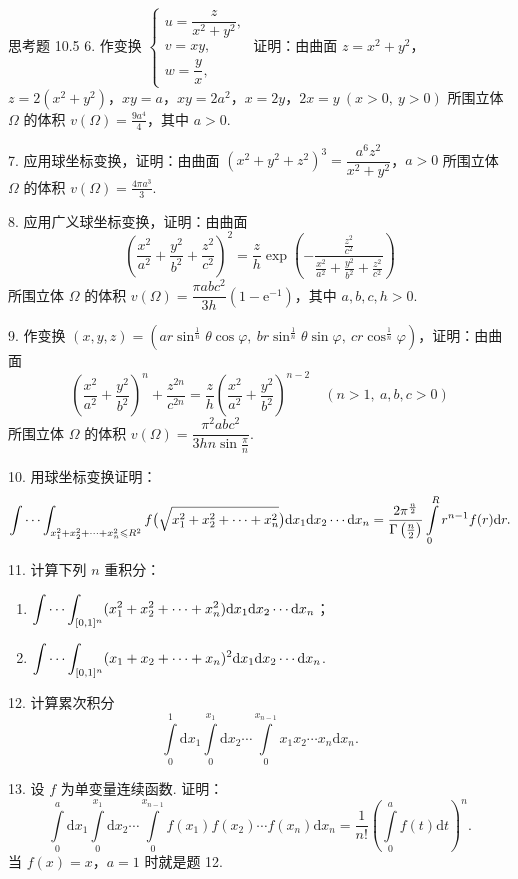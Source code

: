 \begin{exblock}{思考题 10.5}
6. 作变换 $\begin{cases} u = \dfrac{z}{x^2 + y^2},\\ v = xy,\\ w = \dfrac{y}{x}, \end{cases}$
证明：由曲面 $z = x^2 + y^2$，$z = 2(x^2 + y^2)$，$xy = a$，$xy = 2a^2$，$x = 2y$，$2x = y\ (x > 0,\ y > 0)$
所围立体 $\Omega$ 的体积 $v(\Omega) = \frac{9a^4}{4}$，其中 $a > 0$.

7. 应用球坐标变换，证明：由曲面
$(x^2 + y^2 + z^2)^3 = \dfrac{a^6 z^2}{x^2 + y^2}$，$a > 0$ 所围立体 $\Omega$ 的体积
$v(\Omega) = \frac{4\pi a^3}{3}$.

8. 应用广义球坐标变换，证明：由曲面
\[
\left( \frac{x^2}{a^2} + \frac{y^2}{b^2} + \frac{z^2}{c^2} \right)^2
= \frac{z}{h} \exp \left( - \frac{\frac{z^2}{c^2}}{\frac{x^2}{a^2} + \frac{y^2}{b^2} + \frac{z^2}{c^2}} \right)
\]
所围立体 $\Omega$ 的体积
$v(\Omega) = \dfrac{\pi a b c^2}{3h} (1 - \mathrm{e}^{-1})$，其中 $a, b, c, h > 0$.

9. 作变换 $(x, y, z) = (a r \sin^{\frac{1}{n}}\theta \cos\varphi,\ b r \sin^{\frac{1}{n}}\theta \sin\varphi,\
c r \cos^{\frac{1}{n}}\varphi)$，证明：由曲面
\[
\left( \frac{x^2}{a^2} + \frac{y^2}{b^2} \right)^n + \frac{z^{2n}}{c^{2n}}
= \frac{z}{h} \left( \frac{x^2}{a^2} + \frac{y^2}{b^2} \right)^{n-2} \quad (n > 1,\ a, b, c > 0)
\]
所围立体 $\Omega$ 的体积
$v(\Omega) = \dfrac{\pi^2 a b c^2}{3 h n \sin \frac{\pi}{n}}$.

10. 用球坐标变换证明：
\[
\idotsint _{x_1^2 + x_2^2 + \cdots + x_n^2 \leqslant R^2}
  f\bigl( \sqrt{x_1^2 + x_2^2 + \cdots + x_n^2} \bigr)
  \mathrm{d}x_1 \mathrm{d}x_2 \cdots \mathrm{d}x_n
= \frac{2\pi^{\frac{n}{2}}}{\Gamma\left( \frac{n}{2} \right)} \int \limits_0^R r^{n-1} f(r) \mathrm{d}r.
\]

11. 计算下列 $n$ 重积分：
\begin{enumerate}
  \item $\displaystyle \idotsint _{[0, 1]^n}
    (x_1^2 + x_2^2 + \cdots + x_n^2) \mathrm{d}x_1 \mathrm{d}x_2 \cdots \mathrm{d}x_n$；
  \item $\displaystyle \idotsint _{[0, 1]^n}
    (x_1 + x_2 + \cdots + x_n)^2 \mathrm{d}x_1 \mathrm{d}x_2 \cdots \mathrm{d}x_n$.
\end{enumerate}

12. 计算累次积分
\[
\int \limits_0^1 \mathrm{d}x_1 \int \limits_0^{x_1} \mathrm{d}x_2 \cdots \int \limits_0^{x_{n-1}}
  x_1 x_2 \cdots x_n \mathrm{d}x_n.
\]

13. 设 $f$ 为单变量连续函数. 证明：
\[
\int \limits_0^a \mathrm{d}x_1 \int \limits_0^{x_1} \mathrm{d}x_2 \cdots \int \limits_0^{x_{n-1}}
  f(x_1) f(x_2) \cdots f(x_n) \mathrm{d}x_n
= \frac{1}{n!} \left( \int \limits_0^a f(t) \mathrm{d}t \right)^n.
\]
当 $f(x) = x$，$a = 1$ 时就是题 12.


\end{exblock}
